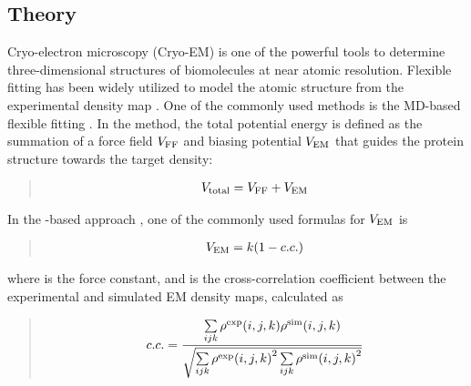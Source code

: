 \documentclass[a4paper,11pt,oneside,english]{sphinxmanual}
\begin{document}
\subsection{Theory}
\label{\detokenize{19_Experiments:theory}}
Cryo-electron microscopy (Cryo-EM) is one of the powerful tools to determine
three-dimensional structures of biomolecules at near atomic resolution.
Flexible fitting has been widely utilized to model the atomic structure
from the experimental density map .
One of the commonly used methods is the MD-based flexible fitting  .
In the method, the total potential energy is defined as the
summation of a force field \(V_{\rm{FF}}\) and biasing potential \(V_{\rm{EM}}\)
that guides the protein structure towards the target density:
\begin{quote}

\vspace{-5mm}
\begin{equation*}
\begin{split}{V_{{\rm{total}}}} = {V_{{\rm{FF}}}} + {V_{{\rm{EM}}}}\end{split}
\end{equation*}
\vspace{-3mm}
\end{quote}

In the -based approach , one of the commonly used formulas for \(V_{\rm{EM}}\) is
\begin{quote}

\vspace{-5mm}
\begin{equation*}
\begin{split}{V_{{\rm{EM}}}} = k(1 - c.c.)\end{split}
\end{equation*}
\vspace{-3mm}
\end{quote}

where  is the force constant, and  is the cross-correlation
coefficient between the experimental and simulated EM density maps,
calculated as
\begin{quote}

\vspace{-5mm}
\begin{equation*}
\begin{split}c.c. = \frac{{\sum\limits_{ijk} {{\rho ^{\exp }}(i,j,k){\rho ^{{\rm{sim}}}}(i,j,k)} }}{{\sqrt {\sum\limits_{ijk} {{\rho ^{\exp }}{{(i,j,k)}^2}\sum\limits_{ijk} {{\rho ^{{\rm{sim}}}}{{(i,j,k)}^2}} } } }}\end{split}
\end{equation*}
\vspace{-3mm}
\end{quote}
\end{document}
